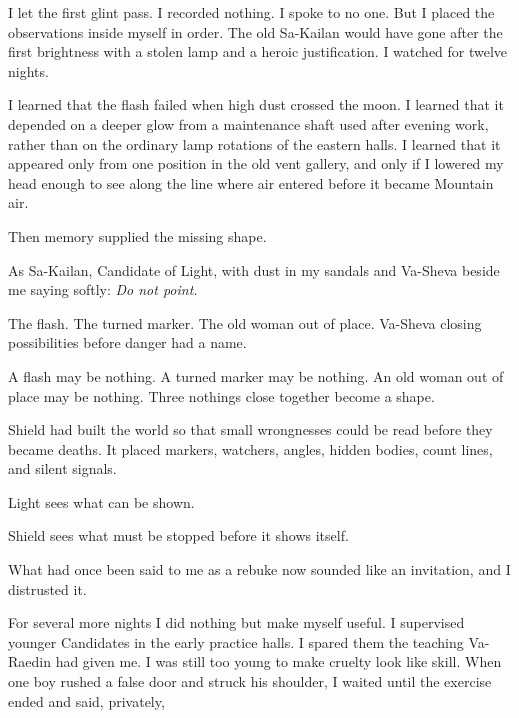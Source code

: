 I let the first glint pass. I recorded nothing. I spoke to no one. But I placed the observations inside myself in order. The old Sa-Kailan would have gone after the first brightness with a stolen lamp and a heroic justification. I watched for twelve nights.\par

I learned that the flash failed when high dust crossed the moon. I learned that it depended on a deeper glow from a maintenance shaft used after evening work, rather than on the ordinary lamp rotations of the eastern halls. I learned that it appeared only from one position in the old vent gallery, and only if I lowered my head enough to see along the line where air entered before it became Mountain air.\par

Then memory supplied the missing shape.\par

As Sa-Kailan, Candidate of Light, with dust in my sandals and Va-Sheva beside me saying softly: \textit{Do not point.}\par

The flash. The turned marker. The old woman out of place. Va-Sheva closing possibilities before danger had a name.\par

A flash may be nothing. A turned marker may be nothing. An old woman out of place may be nothing. Three nothings close together become a shape.\par

Shield had built the world so that small wrongnesses could be read before they became deaths. It placed markers, watchers, angles, hidden bodies, count lines, and silent signals.\par

Light sees what can be shown.\par

Shield sees what must be stopped before it shows itself.\par

What had once been said to me as a rebuke now sounded like an invitation, and I distrusted it.\par

For several more nights I did nothing but make myself useful. I supervised younger Candidates in the early practice halls. I spared them the teaching Va-Raedin had given me. I was still too young to make cruelty look like skill. When one boy rushed a false door and struck his shoulder, I waited until the exercise ended and said, privately,\par

